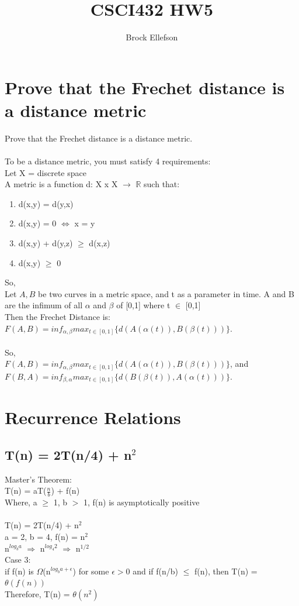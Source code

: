 \documentclass[10pt,letterpaper]{article}
\author{Brock Ellefson}
\title{CSCI432 HW5}
\newcommand{\R}{\mathbb{R}}
\begin{document}
\maketitle

\section{Prove that the Frechet distance is a distance metric}

Prove that the Frechet distance is a distance metric.\\
\\
To be a distance metric, you must satisfy 4 requirements:\\
Let X = discrete space\\
A metric is a function d: X x X $\rightarrow$ $\R$ such that:
\begin{enumerate}
  \item d(x,y) = d(y,x)
  \item d(x,y) = 0 $\Leftrightarrow$ x = y
  \item d(x,y) + d(y,z) $\geq$ d(x,z)
  \item d(x,y) $\geq$ 0
\end{enumerate}
So,\\
Let $A, B$ be two curves in a metric space, and t as a parameter in time. A and B are the infimum of all $\alpha$ and $\beta$ of [0,1] where t $\in$ [0,1]\\
Then the Frechet Distance is:\\
$F(A,B) = inf_{\alpha,\beta} max_{t\in[0,1]}\lbrace d(A(\alpha(t)),B(\beta(t)))\rbrace  $.\\
\\
So,\\
$F(A,B) = inf_{\alpha,\beta} max_{t\in[0,1]}\lbrace d(A(\alpha(t)),B(\beta(t)))\rbrace  $, and\\
$F(B,A) = inf_{\beta,\alpha} max_{t\in[0,1]}\lbrace d(B(\beta(t)),A(\alpha(t)))\rbrace  $.


\section{Recurrence Relations}
\subsection{T(n) = 2T(n/4) + n$^{2}$}
Master's Theorem:\\
T(n) = aT($\frac{n}{b}$) + f(n)\\
Where, a $\geq$ 1, b $>$ 1, f(n) is asymptotically positive\\
\\
T(n) = 2T(n/4) + n$^{2}$\\
a = 2, b = 4, f(n) = n$^{2}$\\
n$^{log_{b}a}$ $\Rightarrow$ n$^{log_{4}2}$ $\Rightarrow$ n$^{1/2}$\\
Case 3:\\
if f(n) is $\Omega$(n$^{log_{b}a + \epsilon}$) for some $\epsilon > 0$ and if f(n/b) $\leq$ f(n), then T(n) = $\theta(f(n))$\\
Therefore, T(n) = $\theta(n^{2})$
\end{document}
